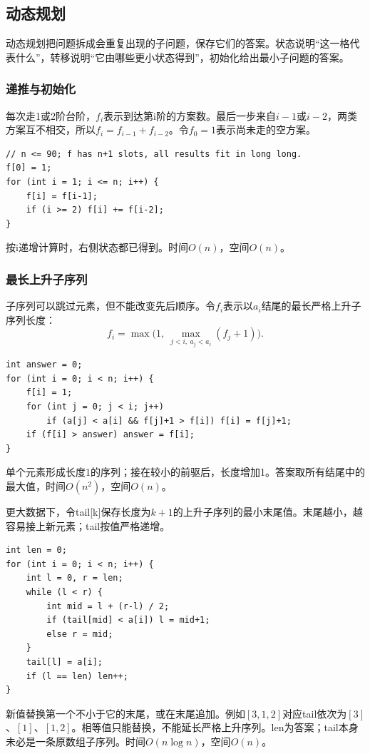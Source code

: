\subsection{动态规划}
动态规划把问题拆成会重复出现的子问题，保存它们的答案。状态说明“这一格代表什么”，转移说明“它由哪些更小状态得到”，初始化给出最小子问题的答案。
\subsubsection{递推与初始化}
每次走1或2阶台阶，$f_i$表示到达第i阶的方案数。最后一步来自$i-1$或$i-2$，两类方案互不相交，所以$f_i=f_{i-1}+f_{i-2}$。令$f_0=1$表示尚未走的空方案。
\begin{lstlisting}
// n <= 90; f has n+1 slots, all results fit in long long.
f[0] = 1;
for (int i = 1; i <= n; i++) {
    f[i] = f[i-1];
    if (i >= 2) f[i] += f[i-2];
}
\end{lstlisting}
按i递增计算时，右侧状态都已得到。时间$O(n)$，空间$O(n)$。
\subsubsection{最长上升子序列}
子序列可以跳过元素，但不能改变先后顺序。令$f_i$表示以$a_i$结尾的最长严格上升子序列长度：
\[
f_i=\max\bigl(1,\ \max_{j<i,\ a_j<a_i}(f_j+1)\bigr).
\]
\begin{lstlisting}
int answer = 0;
for (int i = 0; i < n; i++) {
    f[i] = 1;
    for (int j = 0; j < i; j++)
        if (a[j] < a[i] && f[j]+1 > f[i]) f[i] = f[j]+1;
    if (f[i] > answer) answer = f[i];
}
\end{lstlisting}
单个元素形成长度1的序列；接在较小的前驱后，长度增加1。答案取所有结尾中的最大值，时间$O(n^2)$，空间$O(n)$。

更大数据下，令tail[k]保存长度为$k+1$的上升子序列的最小末尾值。末尾越小，越容易接上新元素；tail按值严格递增。
\begin{lstlisting}
int len = 0;
for (int i = 0; i < n; i++) {
    int l = 0, r = len;
    while (l < r) {
        int mid = l + (r-l) / 2;
        if (tail[mid] < a[i]) l = mid+1;
        else r = mid;
    }
    tail[l] = a[i];
    if (l == len) len++;
}
\end{lstlisting}
新值替换第一个不小于它的末尾，或在末尾追加。例如$[3,1,2]$对应tail依次为$[3]$、$[1]$、$[1,2]$。相等值只能替换，不能延长严格上升序列。len为答案；tail本身未必是一条原数组子序列。时间$O(n\log n)$，空间$O(n)$。
